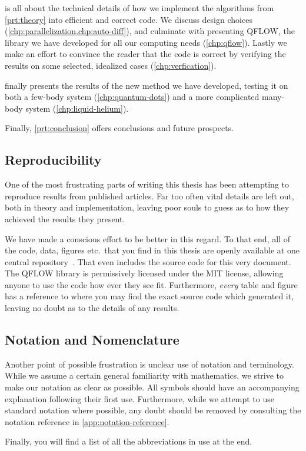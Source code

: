 \documentclass[Thesis.tex]{subfiles}
\begin{document}
 is all about the technical details of how we implement
the algorithms from \cref{prt:theory} into efficient and correct code. We
discuss design choices (\cref{chp:parallelization,chp:auto-diff}), and culminate
with presenting QFLOW, the library we have
developed for all our computing needs (\cref{chp:qflow}). Lastly we make an effort to convince the
reader that the code is correct by verifying the results on some
selected, idealized cases (\cref{chp:verfication}).

 finally presents the results of the new method we have
developed, testing it on both a few-body system (\cref{chp:quantum-dots}) and a
more complicated many-body system (\cref{chp:liquid-helium}).

Finally, \cref{prt:conclusion} offers conclusions and future prospects.

\subsection*{Reproducibility}

One of the most frustrating parts of writing this thesis has been attempting to
reproduce results from published articles. Far too often vital details are left
out, both in theory and implementation, leaving poor souls to guess as to how
they achieved the results they present.

We have made a conscious effort to be
better in this regard. To that end, all of the code, data, figures etc.\ that
you find in this thesis are openly available at one central
repository~\cite{qflow}. That even includes the source code for this very
document. The QFLOW library is permissively licensed under the MIT license,
allowing anyone to use the code how ever they see fit. Furthermore, \emph{every} table
and figure has a reference to where you may find the exact source code which
generated it, leaving no doubt as to the details of any results.

\subsection*{Notation and Nomenclature}

Another point of possible frustration is unclear use of notation and terminology. While we
assume a certain general familiarity with mathematics, we strive to make our
notation as clear as possible. All symbols should have an accompanying
explanation following their first use. Furthermore, while we attempt to use
standard notation where possible, any doubt should be removed by consulting the
notation reference in \cref{app:notation-reference}.

Finally, you will find a list of all the abbreviations in use at the end.
\end{document}
